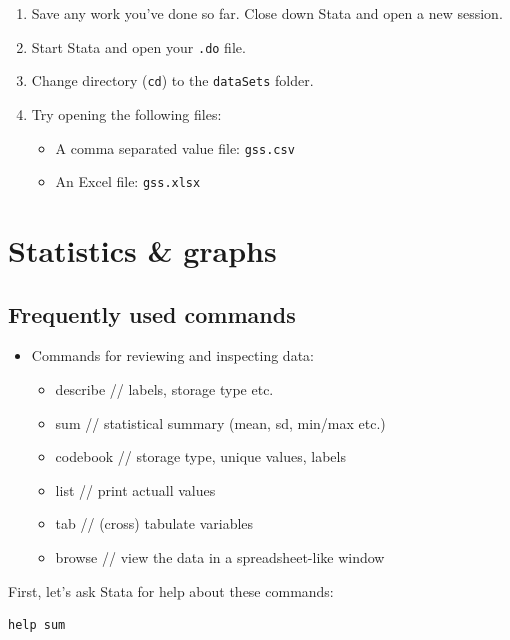 \documentclass[]{book}
\providecommand{\tightlist}{%
  \setlength{\itemsep}{0pt}\setlength{\parskip}{0pt}}
\begin{document}
\begin{enumerate}
\def\labelenumi{\arabic{enumi}.}
\tightlist
\item
  Save any work you've done so far. Close down Stata and open a new
  session.
\item
  Start Stata and open your \texttt{.do} file.
\item
  Change directory (\texttt{cd}) to the \texttt{dataSets} folder.
\item
  Try opening the following files:

  \begin{itemize}
  \tightlist
  \item
    A comma separated value file: \texttt{gss.csv}
  \item
    An Excel file: \texttt{gss.xlsx}
  \end{itemize}
\end{enumerate}

\section{Statistics \& graphs}\label{statistics-graphs}

\subsection{Frequently used commands}\label{frequently-used-commands}

\begin{itemize}
\tightlist
\item
  Commands for reviewing and inspecting data:

  \begin{itemize}
  \tightlist
  \item
    describe // labels, storage type etc.
  \item
    sum // statistical summary (mean, sd, min/max etc.)
  \item
    codebook // storage type, unique values, labels
  \item
    list // print actuall values
  \item
    tab // (cross) tabulate variables
  \item
    browse // view the data in a spreadsheet-like window
  \end{itemize}
\end{itemize}

First, let's ask Stata for help about these commands:

\begin{verbatim}
help sum
\end{verbatim}
\end{document}
